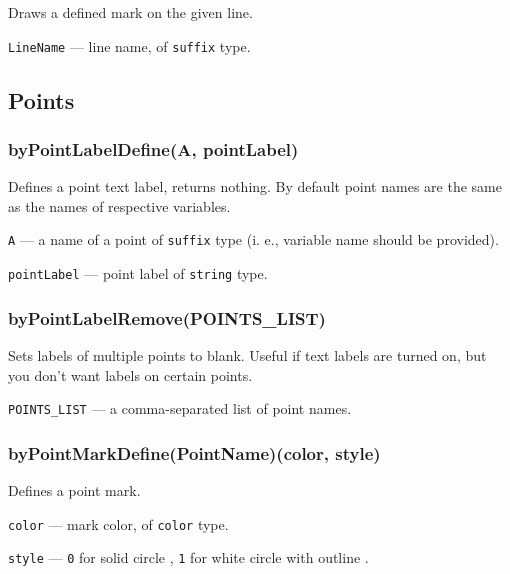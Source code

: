 \documentclass{ltxdoc}
\begin{document}
	Draws a defined mark on the given line.
	
	\texttt{LineName} — line name, of \texttt{suffix} type.
	

\subsection{Points}

\subsubsection{byPointLabelDefine(A, pointLabel)}\label{byPointLabelDefine}

	Defines a point text label, returns nothing. By default point names are the same as the names of respective variables.
	
	\texttt{A} — a name of a point of \texttt{suffix} type  (i. e., variable name should be provided).
	
	\texttt{pointLabel} — point label of \texttt{string} type.

\subsubsection{byPointLabelRemove(POINTS\_LIST)}\label{byPointLabelRemove}

	Sets labels of multiple points to blank. Useful if text labels are turned on, but you don't want labels on certain points.

	\texttt{POINTS\_LIST} — a comma-separated list of point names.

\subsubsection{byPointMarkDefine(PointName)(color, style)}\label{byPointMarkDefine}

	
	Defines a point mark.

	\texttt{color} — mark color, of \texttt{color} type.

	\texttt{style} — \texttt{0} for solid circle , \texttt{1} for white circle with outline .
		
\end{document}
